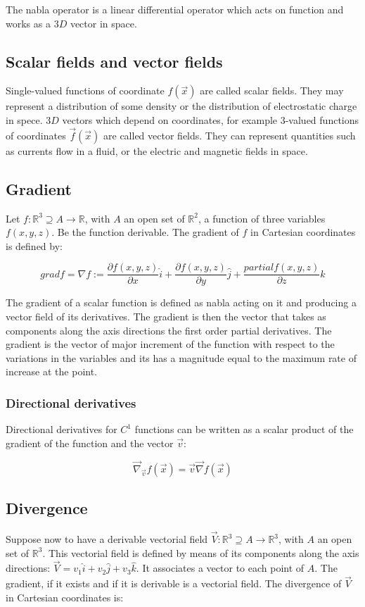 	The nabla operator is a linear differential operator which acts on function and works as a $3D$ vector in space.

	\subsection{Scalar fields and vector fields}
	Single-valued functions of coordinate $f(\vec{x})$ are called scalar fields.
	They may represent a distribution of some density or the distribution of electrostatic charge in spece.
	$3D$ vectors which depend on coordinates, for example $3$-valued functions of coordinates $\vec{f}(\vec{x})$ are called vector fields.
	They can represent quantities such as currents flow in a fluid, or the electric and magnetic fields in space.

	\subsection{Gradient}
	Let $f:\mathbb{R}^3\supseteq A\rightarrow\mathbb{R}$, with $A$ an open set of $\mathbb{R}^2$, a function of three variables $f(x,y,z)$.
	Be the function derivable.
	The gradient of $f$ in Cartesian coordinates is defined by:

	$$grad f = \nabla f := \frac{\partial f(x,y,z)}{\partial x}\hat{i} + \frac{\partial f(x,y,z)}{\partial y}\hat{j} + \frac{partial f(x,y,z)}{\partial z}\hat{k}$$

	The gradient of a scalar function is defined as nabla acting on it and producing a vector field of its derivatives.
	The gradient is then the vector that takes as components along the axis directions the first order partial derivatives.
	The gradient is the vector of major increment of the function with respect to the variations in the variables and its has a magnitude equal to the maximum rate of increase at the point.

		\subsubsection{Directional derivatives}
		Directional derivatives for $C^1$ functions can be written as a scalar product of the gradient of the function and the vector $\vec{v}$:

		$$\vec{\nabla}_{\vec{v}}f(\vec{x}) = \vec{v}\vec{\nabla}f(\vec{x})$$

	\subsection{Divergence}
	Suppose now to have a derivable vectorial field $\vec{V}:\mathbb{R}^3\supseteq A \rightarrow\mathbb{R}^3$, with $A$ an open set of $\mathbb{R}^3$.
	This vectorial field is defined by means of its components along the axis directions: $\vec{V} = v_1\hat{i} + v_2\hat{j} + v_3\hat{k}$.
	It associates a vector to each point of $A$.
	The gradient, if it exists and if it is derivable is a vectorial field.
	The divergence of $\vec{V}$ in Cartesian coordinates is:

